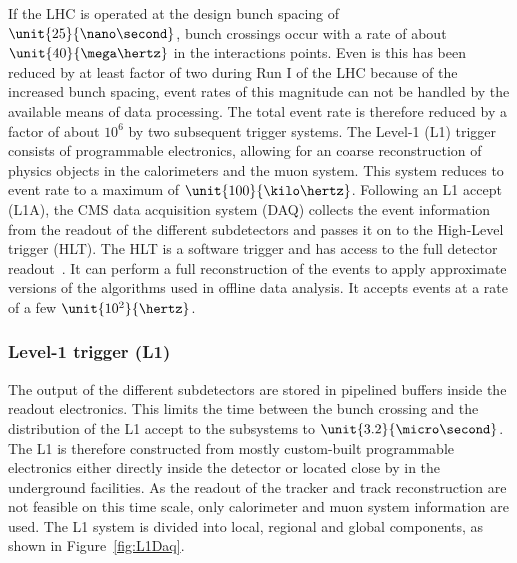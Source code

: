 If the LHC is operated at the design bunch spacing of $\unit{25}{\nano\second}$, bunch crossings occur with a rate of about $\unit{40}{\mega\hertz}$ in the interactions points. Even is this has been reduced by at least factor of two during Run I of the LHC because of the increased bunch spacing, event rates of this magnitude can not be handled by the available means of data processing. The total event rate is therefore reduced by a factor of about $10^6$ by two subsequent trigger systems. The Level-1 (L1) trigger consists of programmable electronics, allowing for an coarse reconstruction of physics objects in the calorimeters and the muon system. This system reduces to event rate to a maximum of $\unit{100}{\kilo\hertz}$. Following an L1 accept (L1A), the CMS data acquisition system (DAQ) collects the event information from the readout of the different subdetectors and passes it on to the High-Level trigger (HLT). The HLT is a software trigger and has access to the full detector readout~\cite{Adam:2005zf}. It can perform a full reconstruction of the events to apply approximate versions of the algorithms used in offline data analysis. It accepts events at a rate of a few $\unit{10^2}{\hertz}$.  

\subsubsection*{Level-1 trigger (L1)}
The output of the different subdetectors are stored in pipelined buffers inside the readout electronics. This limits the time between the bunch crossing and the distribution of the L1 accept to the subsystems to $\unit{3.2}{\micro\second}$. The L1 is therefore constructed from mostly custom-built programmable electronics either directly inside the detector or located close by in the underground facilities. As the readout of the tracker and track reconstruction are not feasible on this time scale, only calorimeter and muon system information are used. The L1 system is divided into local, regional and global components, as shown in Figure~\ref{fig:L1Daq}. 


